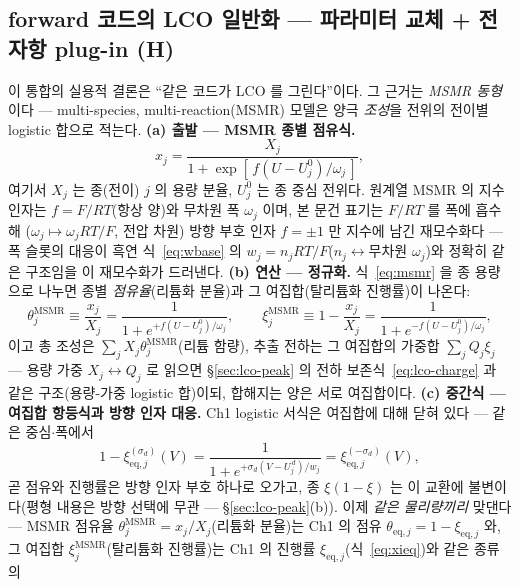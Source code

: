 \documentclass[11pt,a4paper]{article}
\newcommand{\eq}{\mathrm{eq}}
\begin{document}
\subsection{forward 코드의 LCO 일반화 — 파라미터 교체 + 전자항 plug-in (H)}\label{sec:lco-code}
이 통합의 실용적 결론은 ``같은 코드가 LCO 를 그린다''이다. 그 근거는 \emph{MSMR 동형}이다 —
multi-species, multi-reaction(MSMR) 모델\cite{msmr2024}은 양극 \emph{조성}을 전위의 전이별 logistic
합으로 적는다.
\textbf{(a) 출발 — MSMR 종별 점유식.}
\begin{equation}
x_j=\frac{X_j}{1+\exp[\,f(U-U_j^0)/\omega_j\,]},
\label{eq:msmr}
\end{equation}
여기서 $X_j$ 는 종(전이) $j$ 의 용량 분율, $U_j^0$ 는 종 중심 전위다. 원계열 MSMR 의 지수 인자는
$f=F/RT$(항상 양)와 무차원 폭 $\omega_j$ 이며, 본 문건 표기는 $F/RT$ 를 폭에 흡수해
($\omega_j\mapsto\omega_jRT/F$, 전압 차원) 방향 부호 인자 $f=\pm1$ 만 지수에 남긴 재모수화다 — 폭 슬롯의
대응이 흑연 식~\eqref{eq:wbase} 의 $w_j=n_jRT/F$($n_j\leftrightarrow$무차원 $\omega_j$)와 정확히 같은
구조임을 이 재모수화가 드러낸다.
\textbf{(b) 연산 — 정규화.} 식~\eqref{eq:msmr} 을 종 용량으로 나누면
종별 \emph{점유율}(리튬화 분율)과 그 여집합(탈리튬화 진행률)이 나온다:
\begin{equation}
\theta_j^{\mathrm{MSMR}}\equiv\frac{x_j}{X_j}=\frac{1}{1+e^{+f(U-U_j^0)/\omega_j}},\qquad
\xi_j^{\mathrm{MSMR}}\equiv1-\frac{x_j}{X_j}=\frac{1}{1+e^{-f(U-U_j^0)/\omega_j}},
\label{eq:lco-msmrnorm}
\end{equation}
이고 총 조성은 $\sum_jX_j\theta_j^{\mathrm{MSMR}}$(리튬 함량), 추출 전하는 그 여집합의 가중합
$\sum_jQ_j\xi_j$ — 용량 가중 $X_j\!\leftrightarrow\!Q_j$ 로 읽으면 \S\ref{sec:lco-peak} 의 전하
보존식~\eqref{eq:lco-charge} 과 같은 구조(용량-가중 logistic 합)이되, 합해지는 양은 서로 여집합이다.
\textbf{(c) 중간식 — 여집합 항등식과 방향 인자 대응.} Ch1 logistic 서식은 여집합에 대해 닫혀 있다 —
같은 중심$\cdot$폭에서
\begin{equation}
1-\xi_{\eq,j}^{(\sigma_d)}(V)
=\frac{1}{1+e^{+\sigma_d(V-U_j^{\,d})/w_j}}
=\xi_{\eq,j}^{(-\sigma_d)}(V),
\label{eq:lco-comp}
\end{equation}
곧 점유와 진행률은 방향 인자 부호 하나로 오가고, 종 $\xi(1-\xi)$ 는 이 교환에 불변이다(평형 내용은 방향
선택에 무관 — \S\ref{sec:lco-peak}(b)). 이제 \emph{같은 물리량끼리} 맞댄다 — MSMR 점유율
$\theta_j^{\mathrm{MSMR}}=x_j/X_j$(리튬화 분율)는 Ch1 의 점유 $\theta_{\eq,j}=1-\xi_{\eq,j}$ 와, 그 여집합
$\xi_j^{\mathrm{MSMR}}$(탈리튬화 진행률)는 Ch1 의 진행률 $\xi_{\eq,j}$(식~\eqref{eq:xieq})와 같은 종류의
\end{document}
